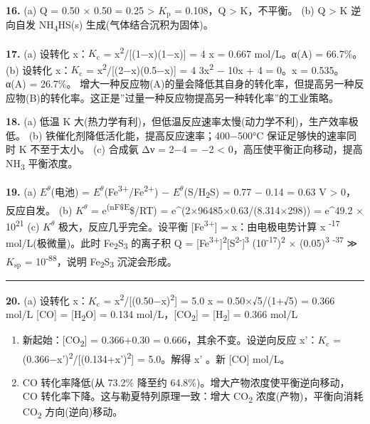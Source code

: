 \textbf{16.}
(a) Q = 0.50 × 0.50 = 0.25 \textgreater{} \(K_{\mathrm p}\) = 0.108，Q \textgreater{} K，不平衡。
(b) Q \textgreater{} K \箭 逆向自发 \箭 NH\textsubscript{4}HS(s) 生成(气体结合沉积为固体)。

\textbf{17.}
(a) 设转化 x：\(K_{\mathrm c}\) = x\textsuperscript{2}/{[}(1−x)(1−x){]} = 4 \箭 x = 0.667 mol/L。α(A) = 66.7\%。
(b) 设转化 x：\(K_{\mathrm c}\) = x\textsuperscript{2}/{[}(2−x)(0.5−x){]} = 4 \箭 3x\textsuperscript{2} − 10x + 4 = 0。x = 0.535。α(A) = 26.7\%。
增大一种反应物(A)的量会降低其自身的转化率，但提高另一种反应物(B)的转化率。这正是''过量一种反应物提高另一种转化率''的工业策略。

\textbf{18.}
(a) 低温 K 大(热力学有利)，但低温反应速率太慢(动力学不利)，生产效率极低。
(b) 铁催化剂降低活化能，提高反应速率；400−500°C 保证足够快的速率同时 K 不至于太小。
(c) 合成氨 Δν = 2−4 = −2 \textless{} 0，高压使平衡正向移动，提高 NH\textsubscript{3} 平衡浓度。

\textbf{19.}
(a) \(E^\theta\)(电池) = \(E^\theta\)(Fe\textsuperscript{3+}/Fe\textsuperscript{2+}) − \(E^\theta\)(S/H\textsubscript{2}S) = 0.77 − 0.14 = 0.63 V \textgreater{} 0，反应自发。
(b) \(K^\theta\) = e\textsuperscript{(nF\$E}\theta\$/RT) = e\^{}(2×96485×0.63/(8.314×298)) = e\^{}49.2  × 10\textsuperscript{21}
(c) \(K^\theta\) 极大，反应几乎完全。设平衡 {[}Fe\textsuperscript{3+}{]} = x：由电极电势计算 x \textsuperscript{-17} mol/L(极微量)。此时 Fe\textsubscript{2}S\textsubscript{3} 的离子积 Q = {[}Fe\textsuperscript{3+}{]}\textsuperscript{2}{[}S\textsuperscript{2-}{]}\textsuperscript{3}  (10\textsuperscript{-17})\textsuperscript{2} × (0.05)\textsuperscript{3} \textsuperscript{-37} ≫ \(K_{\mathrm{sp}}\) = 10\textsuperscript{-88}，说明 Fe\textsubscript{2}S\textsubscript{3} 沉淀会形成。

\begin{center}\rule{0.5\linewidth}{0.5pt}\end{center}

\textbf{20.}
(a) 设转化 x：\(K_{\mathrm c}\) = x\textsuperscript{2}/{[}(0.50−x)\textsuperscript{2}{]} = 5.0 \箭 x = 0.50×√5/(1+√5) = 0.366 mol/L
{[}CO{]} = {[}H\textsubscript{2}O{]} = 0.134 mol/L，{[}CO\textsubscript{2}{]} = {[}H\textsubscript{2}{]} = 0.366 mol/L

\begin{enumerate}
\def\labelenumi{(\alph{enumi})}
\setcounter{enumi}{1}
\item
  新起始：{[}CO\textsubscript{2}{]} = 0.366+0.30 = 0.666，其余不变。设逆向反应 x'：\(K_{\mathrm c}\) = (0.366−x')\textsuperscript{2}/{[}(0.134+x')\textsuperscript{2}{]} = 5.0。解得 x' 。新 {[}CO{]}  mol/L。
\item
  CO 转化率降低(从 73.2\% 降至约 64.8\%)。增大产物浓度使平衡逆向移动，CO 转化率下降。这与勒夏特列原理一致：增大 CO\textsubscript{2} 浓度(产物)，平衡向消耗 CO\textsubscript{2} 方向(逆向)移动。
\end{enumerate}

